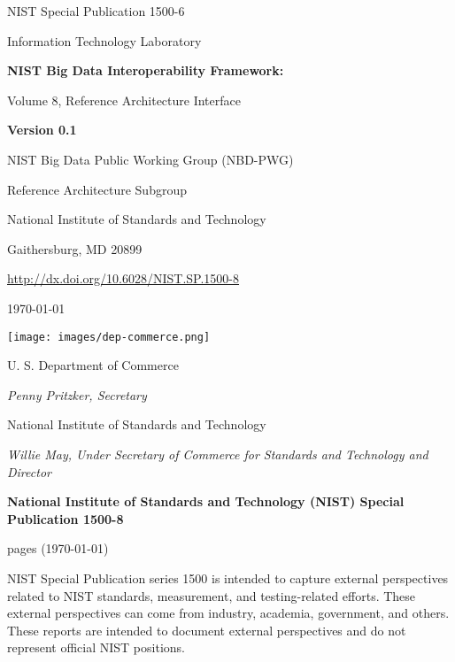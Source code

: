 \begin{flushright}
NIST Special Publication 1500-6

Information Technology Laboratory

\bigskip 

{\Huge\bf\sf NIST Big Data Interoperability Framework:

\bigskip

Volume 8, Reference Architecture Interface
}

\bigskip

{\bf Version 0.1}

\bigskip \bigskip \bigskip \bigskip \bigskip \bigskip

NIST Big Data Public Working Group (NBD-PWG)

Reference Architecture Subgroup

National Institute of Standards and Technology

Gaithersburg, MD 20899

\bigskip

\url{http://dx.doi.org/10.6028/NIST.SP.1500-8}

\bigskip

\today

\vfill

\begin{flushright}
\texttt{[image: images/dep-commerce.png]}
\end{flushright}

 
U. S. Department of Commerce

{\it Penny Pritzker, Secretary}

\bigskip
National Institute of Standards and Technology

{\it Willie May, Under Secretary of Commerce for Standards and Technology and Director}
\end{flushright}


\newpage
\begin{center}
{\bf National Institute of Standards and Technology (NIST) Special
  Publication 1500-8}

\pageref{LastPage} pages (\today)
\end{center}

NIST Special Publication series 1500 is intended to capture external
perspectives related to NIST standards, measurement, and
testing-related efforts. These external perspectives can come from
industry, academia, government, and others. These reports are intended
to document external perspectives and do not represent official NIST
positions.

